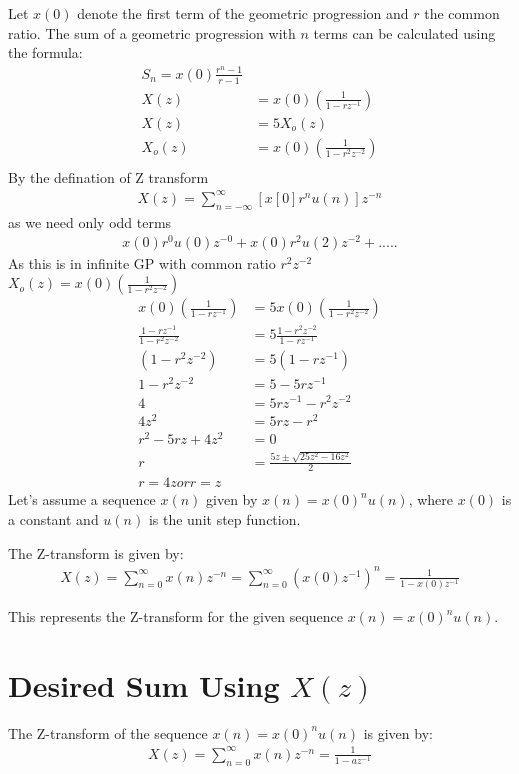 \documentclass{article}
\begin{document}
Let \( x(0) \) denote the first term of the geometric progression and \( r \) the common ratio. The sum of a geometric progression with \( n \) terms can be calculated using the formula:
\begin{align}
 S_n = x(0) \frac{{r^n - 1}}{{r - 1}} \\
X(z) &= x(0)\left(\frac{1}{1 - rz^{-1}}\right) \\
X(z) &= 5 X_o(z) \\
X_o(z) &= x(0)\left(\frac{1}{1 - r^2z^{-2}}\right) \\
\end{align}
By the defination of Z transform 
\begin{align}
X(z)= \sum_{n=-\infty}^{\infty} [x[0]r^{n}u(n)]z^{-n}
\end{align}
as we need only odd terms 
\begin{align}
x(0)r^{0}u(0)z^{-0}+x(0)r^{2}u(2)z^{-2}+.....
\end{align}
As this is in infinite GP with common ratio $r^{2}z^{-2}$\\
$X_o(z)= x(0)\left(\frac{1}{1 - r^2z^{-2}}\right)$ \\
\begin{align}
x(0)\left(\frac{1}{1 - rz^{-1}}\right) &= 5 x(0)\left(\frac{1}{1 - r^2z^{-2}}\right) \\
\frac{1 - rz^{-1}}{1 - r^2z^{-2}} &= 5 \frac{1 - r^2z^{-2}}{1 - rz^{-1}} \\
(1 - r^2z^{-2}) &= 5 (1 - rz^{-1}) \\
1 - r^2z^{-2} &= 5 - 5rz^{-1} \\
4 &= 5rz^{-1} - r^2z^{-2} \\
4z^2 &= 5rz - r^2 \\
r^2 - 5rz + 4z^2 &= 0 \\
r &= \frac{5z \pm \sqrt{25z^2 - 16z^2}}{2}\\
r=4z or r=z
\end{align}
Let's assume a sequence \( x(n) \) given by \( x(n) =x(0)^n u(n) \), where \( x(0) \) is a constant and \( u(n) \) is the unit step function.

The Z-transform is given by:
\begin{align}
X(z) = \sum_{n=0}^{\infty} x(n)z^{-n} = \sum_{n=0}^{\infty} (x(0)z^{-1})^n = \frac{1}{1 - x(0)z^{-1}} 
\end{align}

This represents the Z-transform for the given sequence \( x(n) = x(0)^n u(n) \).

\section*{Desired Sum Using $X(z)$}
The Z-transform of the sequence \( x(n) = x(0)^n u(n) \) is given by:
\begin{align}
X(z) = \sum_{n=0}^{\infty} x(n)z^{-n} = \frac{1}{1 - az^{-1}} 
\end{align}
\end{document}
